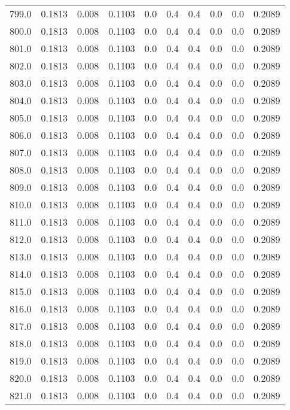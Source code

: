 \begin{longtable}{lrrrrrrrrr}
799.0 & 0.1813 & 0.008 & 0.1103 & 0.0 & 0.4 & 0.4 & 0.0 & 0.0 & 0.2089 \\
800.0 & 0.1813 & 0.008 & 0.1103 & 0.0 & 0.4 & 0.4 & 0.0 & 0.0 & 0.2089 \\
801.0 & 0.1813 & 0.008 & 0.1103 & 0.0 & 0.4 & 0.4 & 0.0 & 0.0 & 0.2089 \\
802.0 & 0.1813 & 0.008 & 0.1103 & 0.0 & 0.4 & 0.4 & 0.0 & 0.0 & 0.2089 \\
803.0 & 0.1813 & 0.008 & 0.1103 & 0.0 & 0.4 & 0.4 & 0.0 & 0.0 & 0.2089 \\
804.0 & 0.1813 & 0.008 & 0.1103 & 0.0 & 0.4 & 0.4 & 0.0 & 0.0 & 0.2089 \\
805.0 & 0.1813 & 0.008 & 0.1103 & 0.0 & 0.4 & 0.4 & 0.0 & 0.0 & 0.2089 \\
806.0 & 0.1813 & 0.008 & 0.1103 & 0.0 & 0.4 & 0.4 & 0.0 & 0.0 & 0.2089 \\
807.0 & 0.1813 & 0.008 & 0.1103 & 0.0 & 0.4 & 0.4 & 0.0 & 0.0 & 0.2089 \\
808.0 & 0.1813 & 0.008 & 0.1103 & 0.0 & 0.4 & 0.4 & 0.0 & 0.0 & 0.2089 \\
809.0 & 0.1813 & 0.008 & 0.1103 & 0.0 & 0.4 & 0.4 & 0.0 & 0.0 & 0.2089 \\
810.0 & 0.1813 & 0.008 & 0.1103 & 0.0 & 0.4 & 0.4 & 0.0 & 0.0 & 0.2089 \\
811.0 & 0.1813 & 0.008 & 0.1103 & 0.0 & 0.4 & 0.4 & 0.0 & 0.0 & 0.2089 \\
812.0 & 0.1813 & 0.008 & 0.1103 & 0.0 & 0.4 & 0.4 & 0.0 & 0.0 & 0.2089 \\
813.0 & 0.1813 & 0.008 & 0.1103 & 0.0 & 0.4 & 0.4 & 0.0 & 0.0 & 0.2089 \\
814.0 & 0.1813 & 0.008 & 0.1103 & 0.0 & 0.4 & 0.4 & 0.0 & 0.0 & 0.2089 \\
815.0 & 0.1813 & 0.008 & 0.1103 & 0.0 & 0.4 & 0.4 & 0.0 & 0.0 & 0.2089 \\
816.0 & 0.1813 & 0.008 & 0.1103 & 0.0 & 0.4 & 0.4 & 0.0 & 0.0 & 0.2089 \\
817.0 & 0.1813 & 0.008 & 0.1103 & 0.0 & 0.4 & 0.4 & 0.0 & 0.0 & 0.2089 \\
818.0 & 0.1813 & 0.008 & 0.1103 & 0.0 & 0.4 & 0.4 & 0.0 & 0.0 & 0.2089 \\
819.0 & 0.1813 & 0.008 & 0.1103 & 0.0 & 0.4 & 0.4 & 0.0 & 0.0 & 0.2089 \\
820.0 & 0.1813 & 0.008 & 0.1103 & 0.0 & 0.4 & 0.4 & 0.0 & 0.0 & 0.2089 \\
821.0 & 0.1813 & 0.008 & 0.1103 & 0.0 & 0.4 & 0.4 & 0.0 & 0.0 & 0.2089 \\

\end{longtable}
